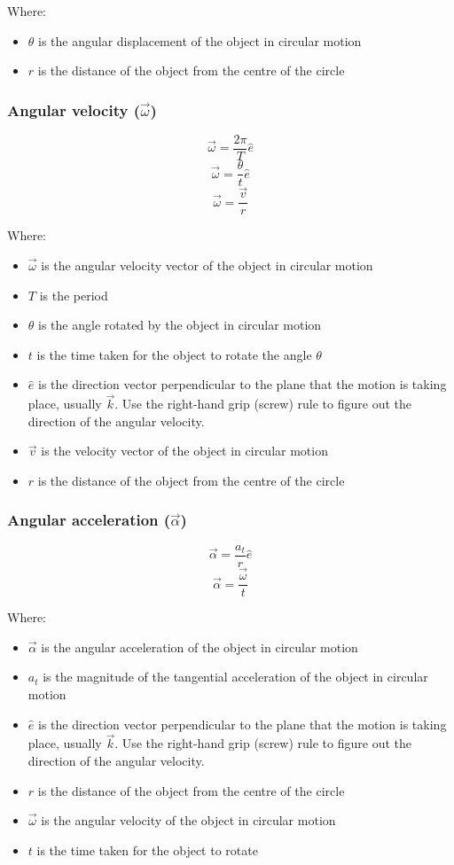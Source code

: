 \documentclass[11pt]{article}
\begin{document}
Where:
\begin{itemize}
\item \(\theta\) is the angular displacement of the object in circular motion
\item \(r\) is the distance of the object from the centre of the circle
\end{itemize}

\subsubsection{Angular velocity (\(\vec{\omega}\))}
\label{sec:org614a8b3}
\[\vec{\omega} = \frac{2 \pi}{T} \hat{e}\]
\[\vec{\omega} = \frac{\theta}{t} \hat{e}\]
\[\vec{\omega} = \frac{\vec{v}}{r}\]

Where:
\begin{itemize}
\item \(\vec{\omega}\) is the angular velocity vector of the object in circular motion
\item \(T\) is the period
\item \(\theta\) is the angle rotated by the object in circular motion
\item \(t\) is the time taken for the object to rotate the angle \(\theta\)
\item \(\hat{e}\) is the direction vector perpendicular to the plane that the motion is taking place, usually \(\vec{k}\). Use the right-hand grip (screw) rule to figure out the direction of the angular velocity.
\item \(\vec{v}\) is the velocity vector of the object in circular motion
\item \(r\) is the distance of the object from the centre of the circle
\end{itemize}

 \newpage

\subsubsection{Angular acceleration (\(\vec{\alpha}\))}
\label{sec:org0981021}
\[\vec{\alpha} = \frac{a_t}{r} \hat{e}\]
\[\vec{\alpha} = \frac{\vec{\omega}}{t}\]

Where:
\begin{itemize}
\item \(\vec{\alpha}\) is the angular acceleration of the object in circular motion
\item \(a_t\) is the magnitude of the tangential acceleration of the object in circular motion
\item \(\hat{e}\) is the direction vector perpendicular to the plane that the motion is taking place, usually \(\vec{k}\). Use the right-hand grip (screw) rule to figure out the direction of the angular velocity.
\item \(r\) is the distance of the object from the centre of the circle
\item \(\vec{\omega}\) is the angular velocity of the object in circular motion
\item \(t\) is the time taken for the object to rotate
\end{itemize}
\end{document}
